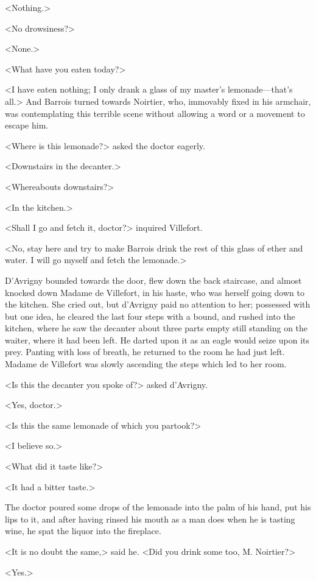  <Nothing.> 

 <No drowsiness?> 

 <None.> 

 <What have you eaten today?> 

 <I have eaten nothing; I only drank a glass of my master's lemonade—that's all.> And Barrois turned towards Noirtier, who, immovably fixed in his armchair, was contemplating this terrible scene without allowing a word or a movement to escape him. 

 <Where is this lemonade?> asked the doctor eagerly. 

 <Downstairs in the decanter.> 

 <Whereabouts downstairs?> 

 <In the kitchen.> 

 <Shall I go and fetch it, doctor?> inquired Villefort. 

 <No, stay here and try to make Barrois drink the rest of this glass of ether and water. I will go myself and fetch the lemonade.> 

 D'Avrigny bounded towards the door, flew down the back staircase, and almost knocked down Madame de Villefort, in his haste, who was herself going down to the kitchen. She cried out, but d'Avrigny paid no attention to her; possessed with but one idea, he cleared the last four steps with a bound, and rushed into the kitchen, where he saw the decanter about three parts empty still standing on the waiter, where it had been left. He darted upon it as an eagle would seize upon its prey. Panting with loss of breath, he returned to the room he had just left. Madame de Villefort was slowly ascending the steps which led to her room. 

 <Is this the decanter you spoke of?> asked d'Avrigny. 

 <Yes, doctor.> 

 <Is this the same lemonade of which you partook?> 

 <I believe so.> 

 <What did it taste like?> 

 <It had a bitter taste.> 

 The doctor poured some drops of the lemonade into the palm of his hand, put his lips to it, and after having rinsed his mouth as a man does when he is tasting wine, he spat the liquor into the fireplace. 

 <It is no doubt the same,> said he. <Did you drink some too, M. Noirtier?> 

 <Yes.> 

